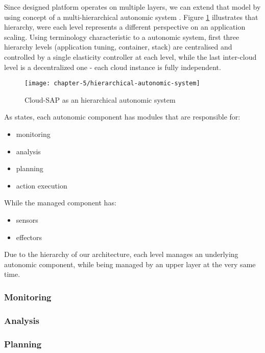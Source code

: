 Since designed platform operates on multiple layers, we can extend that model by using concept of a multi-hierarchical autonomic system \cite{LiWoZh05}. Figure \ref{design:hierarchical-autonomic-system} illustrates that hierarchy, were each level represents a different perspective on an application scaling. Using terminology characteristic to a autonomic system, first three hierarchy levels (application tuning, container, stack) are centralised and controlled by a single elasticity controller at each level, while the last inter-cloud level is a decentralized one - each cloud instance is fully independent.

\begin{figure}[!ht]
  \begin{center}
    \texttt{[image: chapter-5/hierarchical-autonomic-system]}
  \end{center}
  \caption{Cloud-SAP as an hierarchical autonomic system}
  \label{design:hierarchical-autonomic-system}
\end{figure}

As \cite{IBM06} states, each autonomic component has modules that are responsible for:
\begin{itemize}
	\item monitoring
	\item analysis
	\item planning
	\item action execution
\end{itemize}

While the managed component has:
\begin{itemize}
	\item sensors
	\item effectors
\end{itemize}

Due to the hierarchy of our architecture, each level manages an underlying autonomic component, while being managed by an upper layer at the very same time.

\subsubsection{Monitoring}

\subsubsection{Analysis}

\subsubsection{Planning}

